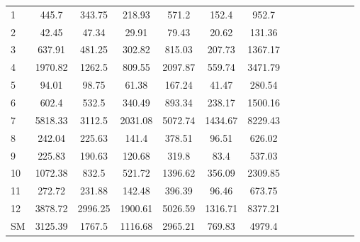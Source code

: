 \begin{table}[h]
\begin{tabular}{|l|c|c|c|c|c|c|c|c|c|c|c|c|c|}
1 & 445.7 & 343.75 & 218.93 & 571.2 & 152.4 & 952.7\\
2 & 42.45 & 47.34 & 29.91 & 79.43 & 20.62 & 131.36\\
3 & 637.91 & 481.25 & 302.82 & 815.03 & 207.73 & 1367.17\\
4 & 1970.82 & 1262.5 & 809.55 & 2097.87 & 559.74 & 3471.79\\
5 & 94.01 & 98.75 & 61.38 & 167.24 & 41.47 & 280.54\\
6 & 602.4 & 532.5 & 340.49 & 893.34 & 238.17 & 1500.16\\
7 & 5818.33 & 3112.5 & 2031.08 & 5072.74 & 1434.67 & 8229.43\\
8 & 242.04 & 225.63 & 141.4 & 378.51 & 96.51 & 626.02\\
9 & 225.83 & 190.63 & 120.68 & 319.8 & 83.4 & 537.03\\
10 & 1072.38 & 832.5 & 521.72 & 1396.62 & 356.09 & 2309.85\\
11 & 272.72 & 231.88 & 142.48 & 396.39 & 96.46 & 673.75\\
12 & 3878.72 & 2996.25 & 1900.61 & 5026.59 & 1316.71 & 8377.21\\
SM & 3125.39 & 1767.5 & 1116.68 & 2965.21 & 769.83 & 4979.4\\
\hline
\end{tabular}
\end{table} 
 
